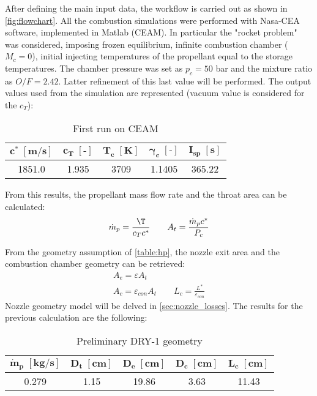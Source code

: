 After defining the main input data, the workflow is carried out as shown in \autoref{fig:flowchart}. All the combustion simulations were performed with Nasa-CEA software, implemented in Matlab (CEAM). In particular the "rocket problem" was considered, imposing frozen equilibrium, infinite combustion chamber ($M_c = 0$), initial injecting temperatures of the propellant equal to the storage temperatures. The chamber pressure was set as $p_c = 50$ bar and the mixture ratio as $O/F = 2.42$. Latter refinement of this last value will be performed. The output values used from the simulation are represented (vacuum value is considered for the $c_T$):
\begin{table}[H]
    \renewcommand{\arraystretch}{1.2}
    \centering
    \begin{tabular}{|c|c|c|c|c|}
        \hline
        $\boldsymbol{c^* \; [\textbf{m/s}]}$ & $\boldsymbol{c_T \; [\textbf{-}]}$ & $\boldsymbol{T_c \; [\textbf{K}]}$ & $\boldsymbol{\gamma_c \; [\textbf{-}]}$ & $\boldsymbol{I_{sp} \; [\textbf{s}]}$ \\
        \hline
        \hline
        1851.0 & 1.935 & 3709 & 1.1405 & 365.22 \\
        \hline
    \end{tabular}
    \caption{First run on CEAM}
    \label{table:out_CEA_1}
\end{table}

From this results, the propellant mass flow rate and the throat area can be calculated:
\begin{equation}
    \dot{m}_p = \frac{\T}{c_T c^*} 
    \qquad 
    A_t = \frac{\dot{m}_p c^*}{P_c}
\end{equation}

From the geometry assumption of \autoref{table:hp}, the nozzle exit area and the combustion chamber geometry can be retrieved:
\begin{gather}
    A_e = \varepsilon A_t
    \\
    A_c = \varepsilon_{con} A_t \qquad L_c = \frac{L^*}{\varepsilon_{con}}
\end{gather}
Nozzle geometry model will be delved in \autoref{sec:nozzle_losses}. The results for the previous calculation are the following:

\begin{table}[H]
    \renewcommand{\arraystretch}{1.2}
    \centering
    \begin{tabular}{|c|c|c|c|c|}
        \hline
        $\boldsymbol{\dot{m}_p \; [\textbf{kg/s}]}$ & $\boldsymbol{D_t \; [\textbf{cm}]}$ & $\boldsymbol{D_e \; [\textbf{cm}]}$  & $\boldsymbol{D_{c} \; [\textbf{cm}]}$ & $\boldsymbol{L_c \; [\textbf{cm}]}$ \\
        \hline
        \hline
        0.279 & 1.15 & 19.86 & 3.63 & 11.43 \\
        \hline
    \end{tabular}
    \caption{Preliminary DRY-1 geometry}
    \label{table:preliminary_dry}
\end{table}

